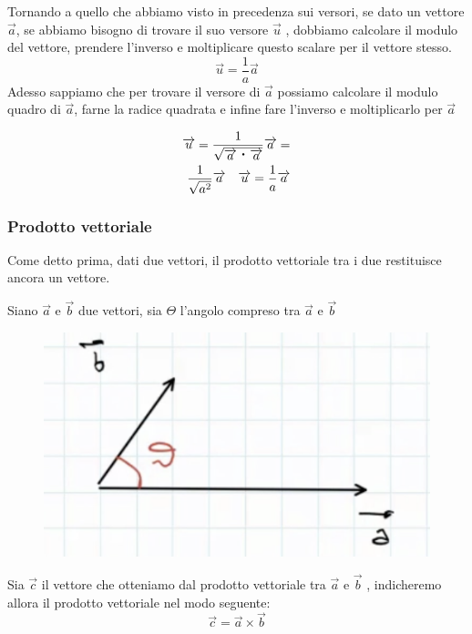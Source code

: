 Tornando a quello che abbiamo visto in precedenza sui versori, se dato un vettore $\overrightarrow{a} $, se abbiamo bisogno di trovare il suo versore $ \overrightarrow{u} $ , dobbiamo calcolare il modulo del vettore, prendere l'inverso e moltiplicare questo scalare per il vettore stesso. 
$$ \overrightarrow{u} = \frac{1}{a} \overrightarrow{a} $$
Adesso sappiamo che per trovare il versore di $\overrightarrow{a}$ possiamo calcolare il modulo quadro di $ \overrightarrow{a }$, farne la radice quadrata e infine fare l'inverso e moltiplicarlo per $\overrightarrow{a}$

\begin{align*}
\overrightarrow{u} = \frac{1}{\sqrt{ \overrightarrow{a} \prodscal \overrightarrow{a}}} \overrightarrow{a} = \\
 \frac{1}{\sqrt{a^{2}}} \overrightarrow{a} \quad \overrightarrow{u} = \frac{1}{a} \overrightarrow{a}  
\end{align*}

\subsubsection{Prodotto vettoriale}
Come detto prima, dati due vettori, il prodotto vettoriale tra i due restituisce ancora un vettore.

Siano $ \overrightarrow{a}$ e $\overrightarrow{b} $ due vettori, sia $ \Theta $ l'angolo compreso tra $ \overrightarrow{a} $ e $ \overrightarrow{b} $

\begin{figure}[h]
\begin{center}
\includegraphics[width = 0.5 \textwidth]{lezione1/images/vettoriale1}
\label{fig:vettoriale1}
\end{center}
\end{figure}

Sia $ \overrightarrow{c} $ il vettore che otteniamo dal prodotto vettoriale tra $ \overrightarrow{a} $ e $ \overrightarrow{b} $ , indicheremo allora il prodotto vettoriale nel modo seguente:
$$ \overrightarrow{c} = \overrightarrow{a} \times \overrightarrow{b} $$

